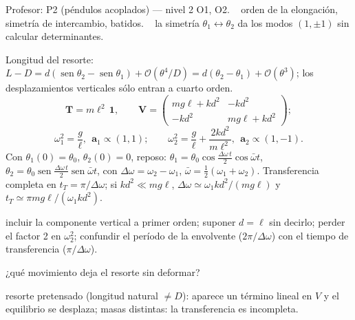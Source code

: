 \documentclass[spanish]{beamer}
\newcommand{\Tm}{\mathbf{T}}              %
\newcommand{\Vm}{\mathbf{V}}              %
\newcommand{\ba}{\boldsymbol{a}}          %
\newcommand{\Id}{\mathbf{1}}
\begin{document}
\begin{frame}{Profesor: P2 (péndulos acoplados) --- nivel 2}
\scriptsize
{} O1, O2. \  orden de la elongación, simetría de intercambio, batidos. \  la simetría $\theta_1\leftrightarrow\theta_2$ da los modos $(1,\pm1)$ sin calcular determinantes.

 Longitud del resorte: $L-D=d(\operatorname{sen}\theta_2-\operatorname{sen}\theta_1)+\mathcal{O}(\theta^4/D)=d(\theta_2-\theta_1)+\mathcal{O}(\theta^3)$; los desplazamientos verticales sólo entran a cuarto orden.
\[
\Tm=m\ell^2\,\Id,\qquad
\Vm=\begin{pmatrix}mg\ell+kd^2&-kd^2\\-kd^2&mg\ell+kd^2\end{pmatrix};
\]
\[
\omega_1^2=\frac{g}{\ell},\ \ \ba_1\propto(1,1);\qquad \omega_2^2=\frac{g}{\ell}+\frac{2kd^2}{m\ell^2},\ \ \ba_2\propto(1,-1).
\]
Con $\theta_1(0)=\theta_0$, $\theta_2(0)=0$, reposo: $\theta_1=\theta_0\cos\tfrac{\Delta\omega\,t}{2}\cos\bar\omega t$, \ $\theta_2=\theta_0\operatorname{sen}\tfrac{\Delta\omega\,t}{2}\operatorname{sen}\bar\omega t$, con $\Delta\omega=\omega_2-\omega_1$, $\bar\omega=\tfrac12(\omega_1+\omega_2)$. Transferencia completa en $t_T=\pi/\Delta\omega$; si $kd^2\ll mg\ell$, $\Delta\omega\simeq\omega_1kd^2/(mg\ell)$ y $t_T\simeq\pi mg\ell/(\omega_1kd^2)$.

 incluir la componente vertical a primer orden; suponer $d=\ell$ sin decirlo; perder el factor 2 en $\omega_2^2$; confundir el período de la envolvente ($2\pi/\Delta\omega$) con el tiempo de transferencia ($\pi/\Delta\omega$).

 ¿qué movimiento deja el resorte sin deformar?

 resorte pretensado (longitud natural $\neq D$): aparece un término lineal en $V$ y el equilibrio se desplaza; masas distintas: la transferencia es incompleta.
\end{frame}
\end{document}
